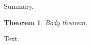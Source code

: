 \documentclass{article}
\newtheorem{theorem}{Theorem}
\begin{document}
\abstract Summary.

\begin{theorem}Body theorem.\end{theorem}
Text.
\end{document}
